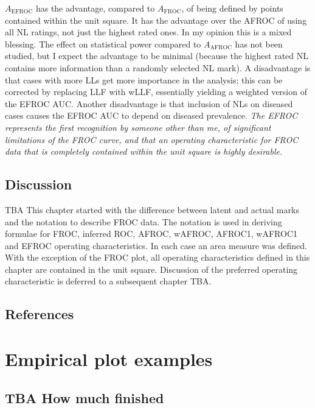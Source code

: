 \documentclass[
]{book}
\begin{document}
\(A_{\text{EFROC}}\) has the advantage, compared to \(A_{\text{FROC}}\), of being defined by points contained within the unit square. It has the advantage over the AFROC of using all NL ratings, not just the highest rated ones. In my opinion this is a mixed blessing. The effect on statistical power compared to \(A_{\text{AFROC}}\) has not been studied, but I expect the advantage to be minimal (because the highest rated NL contains more information than a randomly selected NL mark). A disadvantage is that cases with more LLs get more importance in the analysis; this can be corrected by replacing LLF with wLLF, essentially yielding a weighted version of the EFROC AUC. Another disadvantage is that inclusion of NLs on diseased cases causes the EFROC AUC to depend on diseased prevalence. \emph{The EFROC represents the first recognition by someone other than me, of significant limitations of the FROC curve, and that an operating characteristic for FROC data that is completely contained within the unit square is highly desirable.}

\hypertarget{froc-empirical-Discussion}{%
\section{Discussion}\label{froc-empirical-Discussion}}

TBA This chapter started with the difference between latent and actual marks and the notation to describe FROC data. The notation is used in deriving formulae for FROC, inferred ROC, AFROC, wAFROC, AFROC1, wAFROC1 and EFROC operating characteristics. In each case an area measure was defined. With the exception of the FROC plot, all operating characteristics defined in this chapter are contained in the unit square. Discussion of the preferred operating characteristic is deferred to a subsequent chapter TBA.

\hypertarget{froc-empirical-references}{%
\section{References}\label{froc-empirical-references}}

\hypertarget{froc-empirical-examples}{%
\chapter{Empirical plot examples}\label{froc-empirical-examples}}

\hypertarget{froc-empirical-examples-how-much-finished}{%
\section{TBA How much finished}\label{froc-empirical-examples-how-much-finished}}
\end{document}
